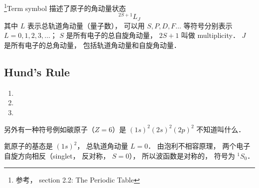 

\footnote{参考\cite{GriffQ}， section 2.2: The Periodic Table}Term symbol 描述了原子的角动量状态
\begin{equation}
^{2S + 1} L_J
\end{equation}
其中 $L$ 表示总轨道角动量（量子数）， 可以用 $S, P, D, F \dots$ 等符号分别表示 $L = 0, 1, 2, 3, \dots$； $S$ 是所有电子的总自旋角动量， $2S + 1$ 叫做 multiplicity． $J$ 是所有电子的总角动量， 包括轨道角动量和自旋角动量．

\subsection{Hund's Rule}

\begin{enumerate}
\item 
\item 
\item 
\end{enumerate}

另外有一种符号例如碳原子（$Z = 6$）是 $(1s)^2 (2s)^2 (2p)^2$ 不知道叫什么．

氦原子的基态是 $(1s)^2$， 总轨道角动量 $L = 0$． 由泡利不相容原理， 两个电子自旋方向相反（singlet， 反对称， $S = 0$）， 所以波函数是对称的， 符号为 $^1 S_0$．
